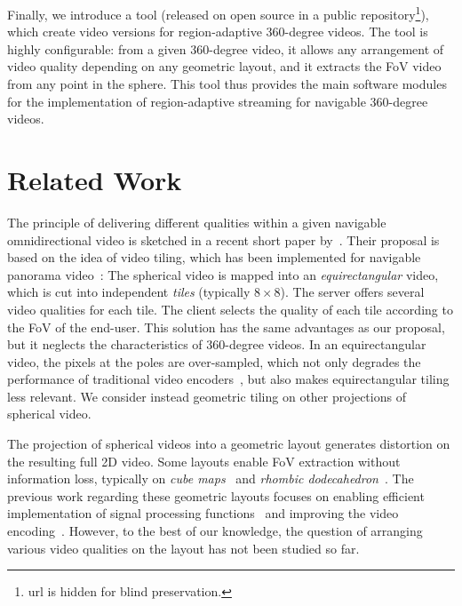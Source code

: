 Finally, we introduce a tool (released on open source in a public
repository\footnote{url is hidden for blind
preservation.}), which create video versions for region-adaptive 360-degree videos.
The tool is highly configurable: from a given 360-degree video, it allows
any arrangement of video quality depending on any geometric layout, and it
extracts the
\ac{FoV} video from any point in the sphere. This tool thus provides the
main software modules for the implementation of region-adaptive streaming
for navigable 360-degree videos.


\section{Related Work}
\label{sec:relatedwork}

The principle of delivering different qualities within a given navigable omnidirectional video is sketched
in a recent short paper by~\citet{ochi_live_2015}. Their proposal is based on the idea of video
tiling, which has been implemented for navigable panorama
video~\cite{sanchez_compressed_2015,wang_mixing_2014,gaddam_tiling_2015}:
The spherical video is mapped into an \emph{equirectangular} video, which
is cut into independent \emph{tiles} (typically $8\times 8$). The server offers several
video qualities for each tile. The client selects the quality of each tile according to
the \ac{FoV} of the end-user. This
solution has the same advantages as our proposal, but it neglects
the characteristics of 360-degree
videos. In an equirectangular video, the pixels
at the poles are over-sampled, which not only degrades the
performance of traditional video encoders~\cite{wojciechowski_h.264_2006,yu_framework_2015}, but also
makes equirectangular tiling less relevant. We consider instead geometric tiling on
other projections of spherical video.


The projection of spherical videos into a geometric layout generates
distortion on the resulting
full 2D video. Some layouts enable \ac{FoV} extraction without information
loss, typically on \emph{cube maps}~\cite{Ng2005} and
\emph{rhombic dodecahedron}~\cite{fu_rhombic_2009}. The previous work regarding
these
geometric layouts focuses on enabling efficient implementation of signal processing
functions~\cite{kazhdan_metric-aware_2010} and improving the video
encoding~\cite{tosic_low_2009}.
However, to the best of our knowledge, the
question of arranging various video qualities on the layout has not been studied so far.

